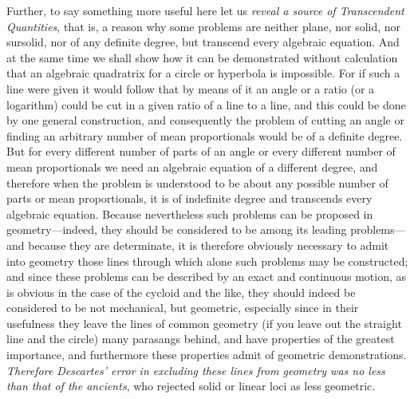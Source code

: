 \documentclass[polutonikogreek,english,twoside,openright]{article}
\begin{document}
Further, to say something more useful here let us {\em reveal a source
  of Transcendent Quantities}, that is, a reason why some problems are
neither plane, nor solid, nor sursolid, nor of any definite degree,
but transcend every algebraic equation.  And at the same time we shall
show how it can be demonstrated without calculation that an algebraic
quadratrix for a circle or hyperbola is impossible.\label{logtrans}
For if such a line were given it would follow that by means of it an
angle or a ratio (or a logarithm) could be cut in a given ratio of a
line to a line, and this could be done by one general construction,
and consequently the problem of cutting an angle or finding an
arbitrary number of mean proportionals would be of a definite degree.
But for every different number of parts of an angle or every different
number of mean proportionals we need an algebraic equation of a
different degree, and therefore when the problem is understood to be
about any possible number of parts or mean proportionals, it is of
indefinite degree and transcends every algebraic equation.  Because
nevertheless such problems can be proposed in geometry---indeed,
they should be considered to be among its leading problems---and
because they are determinate, it is therefore obviously necessary to
admit into geometry those lines through which alone such problems may
be constructed; and since these problems can be described by an exact
and continuous motion, as is obvious in the case of the cycloid and
the like, they should indeed be
considered to be not mechanical, but geometric, especially since in
their usefulness they leave the lines of common geometry (if you leave
out the straight line and the circle) many parasangs behind, and have
properties of the greatest importance, and furthermore these
properties admit of geometric demonstrations.  {\em Therefore
  Descartes' error in excluding these lines from geometry was no less
  than that of the ancients}, who rejected solid or linear loci as
less geometric.
\end{document}
